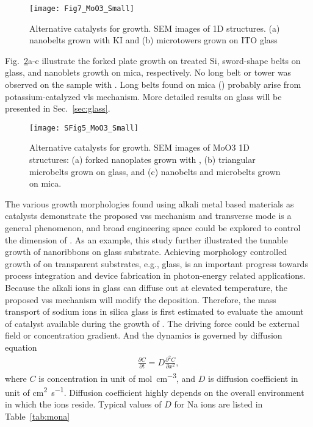 \begin{figure}[htb]
\centering
\texttt{[image: Fig7\_MoO3\_Small]}
\caption[Alternative catalysts for  growth]{Alternative catalysts for  growth. SEM images of  1D structures. (a) nanobelts grown with KI and (b) microtowers grown on ITO glass}
\label{fig:ch4al1}
\end{figure}

Fig.~\ref{fig:ch4al2}a-c illustrate the forked plate growth on  treated Si, sword-shape belts on glass, and nanoblets growth on mica, respectively. No long belt or tower was observed on the sample with . Long belts found on mica () probably arise from potassium-catalyzed \gls{vls} mechanism.\cite{Hu2011} More detailed results on glass will be presented in Sec.~\ref{sec:glass}. 

\begin{figure}[htb]
\centering
\texttt{[image: SFig5\_MoO3\_Small]}
\caption[Alternative catalysts for  growth cont]{Alternative catalysts for  growth. SEM images of MoO3 1D structures: (a) forked nanoplates grown with , (b) triangular microbelts grown on glass, and (c) nanobelts and microbelts grown on mica.}
\label{fig:ch4al2}
\end{figure}

The various growth morphologies found using alkali metal based materials as catalysts demonstrate the proposed \gls{vss} mechanism and transverse mode is a general phenomenon, and broad engineering space could be explored to control the dimension of . As an example, this study further illustrated the tunable growth of  nanoribbons on glass substrate. Achieving morphology controlled growth of  on transparent substrates, e.g., glass, is an important progress towards process integration and device fabrication in photon-energy related applications. Because the alkali ions in glass can diffuse out at elevated temperature, the proposed \gls{vss} mechanism will modify the  deposition. Therefore, the mass transport of sodium ions in silica glass is first estimated to evaluate the amount of catalyst available during the growth of . The driving force could be external field or concentration gradient. And the dynamics is governed by diffusion equation
\begin{align}\label{eq:nadiff}
\frac{\partial C}{\partial t} = D \frac{\partial^2 C}{\partial x^2},
\end{align}
where $C$ is concentration in unit of \si{mol\per cm^3}, and $D$ is diffusion coefficient in unit of \si{cm^2\per\second}. Diffusion coefficient highly depends on the overall environment in which the ions reside. Typical values of $D$ for Na ions are listed in Table~\ref{tab:mona}

